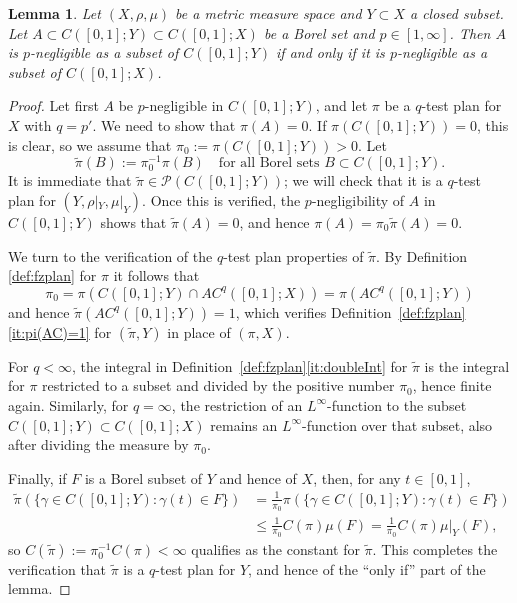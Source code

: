 \documentclass[11pt]{amsart}
\newtheorem{lemma}[theorem]{Lemma}
\theoremstyle{definition}
\theoremstyle{remark}
\numberwithin{equation}{section}
\begin{document}
\begin{lemma}\label{lem:negligible}
Let $(X,\rho,\mu)$ be a metric measure space and $Y\subset X$ a closed subset.
Let $A\subset C([0,1];Y)\subset C([0,1];X)$ be a Borel set and $p\in[1,\infty]$.
Then $A$ is $p$-negligible as a subset of $C([0,1];Y)$ if and only if
it is $p$-negligible as a subset of $C([0,1];X)$.
\end{lemma}

\begin{proof}
Let first $A$ be $p$-negligible in $C([0,1];Y)$, and let $\pi$ be a $q$-test plan for $X$
with $q=p'$. We need to show that $\pi(A)=0$. If $\pi(C([0,1];Y))=0$, this is clear, so we
assume that $\pi_0:=\pi(C([0,1];Y))>0$. Let
\begin{equation*}
  \tilde\pi(B):=\pi_0^{-1}\pi(B)\quad\text{for all Borel sets }B\subset C([0,1];Y).
\end{equation*}
It is immediate that $\tilde\pi\in\mathscr P(C([0,1];Y))$; we will check that it is a
$q$-test plan for $(Y,\rho|_Y,\mu|_Y)$. Once this is verified, the $p$-negligibility of $A$
in $C([0,1];Y)$ shows that $\tilde\pi(A)=0$, and hence $\pi(A)=\pi_0\tilde\pi(A)=0$.

We turn to the verification of the $q$-test plan properties of $\tilde\pi$. By
Definition \ref{def:fzplan} for $\pi$ it follows that
\begin{equation*}
  \pi_0=\pi(C([0,1];Y)\cap AC^q([0,1];X))=\pi(AC^q([0,1];Y))
\end{equation*}
and hence $\tilde\pi(AC^q([0,1];Y))=1$, which verifies
Definition~\ref{def:fzplan}\eqref{it:pi(AC)=1}
for $(\tilde\pi,Y)$ in place of $(\pi,X)$.

For $q<\infty$, the integral in
Definition~\ref{def:fzplan}\eqref{it:doubleInt} for $\tilde\pi$ is the integral for
$\pi$ restricted to a subset and divided by the positive number $\pi_0$,
hence finite again. Similarly, for $q=\infty$, the restriction of an $L^\infty$-function to
the subset $C([0,1];Y)\subset C([0,1];X)$ remains an $L^\infty$-function over that subset,
also after dividing the measure by $\pi_0$.

Finally, if $F$ is a Borel subset of $Y$ and hence of $X$,
then, for any $t\in[0,1]$,
\begin{equation*}
\begin{split}
  \tilde\pi(\{\gamma\in C([0,1];Y):\gamma(t)\in F\})
  &=\frac{1}{\pi_0}\pi(\{\gamma\in C([0,1];Y):\gamma(t)\in F\}) \\
  &\leq\frac{1}{\pi_0}C(\pi)\mu(F)
  =\frac{1}{\pi_0}C(\pi)\mu|_Y(F),
\end{split}
\end{equation*}
so $C(\tilde\pi):=\pi_0^{-1}C(\pi)<\infty$ qualifies as the constant for $\tilde\pi$. This
completes the verification that $\tilde\pi$ is a $q$-test plan for $Y$, and hence of the
``only if'' part of the lemma.


\end{proof}
\end{document}
